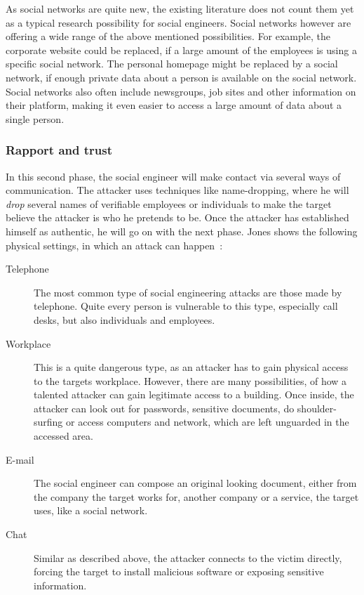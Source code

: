 As social networks are quite new, the existing literature does not count them
yet as a typical research possibility for social engineers. Social networks
however are offering a wide range of the above mentioned possibilities. For
example, the corporate website could be replaced, if a large amount of the
employees is using a specific social network. The personal homepage might be
replaced by a social network, if enough private data about a person is
available on the social network. Social networks also often include newsgroups,
job sites and other information on their platform, making it even easier to
access a large amount of data about a single person.


\subsubsection{Rapport and trust}

In this second phase, the social engineer will make contact via several ways of
communication. The attacker uses techniques like name-dropping, where he will
\textit{drop} several names of verifiable employees or individuals to make the
target believe the attacker is who he pretends to be. Once the attacker has
established himself as authentic, he will go on with the next phase. Jones
shows the following physical settings, in which an attack can happen~\cite{jones2004}:

\begin{description}
\item[Telephone] The most common type of social engineering attacks are those
  made by telephone. Quite every person is vulnerable to this type,
  especially call desks, but also individuals and employees.
\item[Workplace] This is a quite dangerous type, as an attacker has to gain
  physical access to the targets workplace. However, there are many
  possibilities, of how a talented attacker can gain legitimate access to a building.
  Once inside, the attacker can look out for passwords, sensitive documents,
  do shoulder-surfing or access computers and network, which are left
  unguarded in the accessed area.
\item[E-mail] The social engineer can compose an original looking document,
  either from the company the target works for, another company or a service,
  the target uses, like a social network.
\item[Chat] Similar as described above, the attacker connects to the victim directly,
  forcing the target to install malicious software or exposing sensitive
  information.
\end{description}

